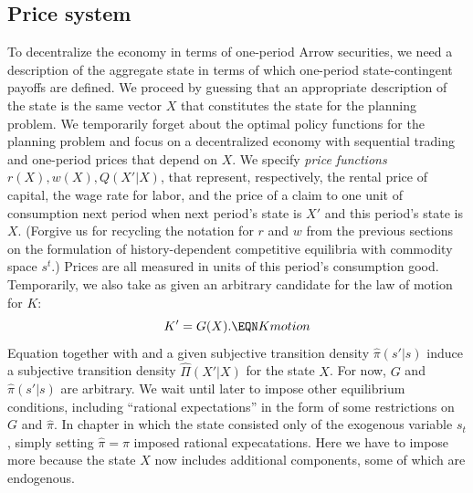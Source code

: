 \subsection{Price system}
To decentralize the economy in terms of one-period Arrow securities,
we need a description of the aggregate state in terms of which one-period
state-contingent payoffs are defined.  We proceed by guessing that an
appropriate description of the state is the same vector $X$ that
constitutes the state for the planning problem.  We temporarily forget
about the optimal policy functions for the planning problem and focus
on a decentralized economy with sequential trading and one-period
prices that depend on $X$. We specify {\it price functions\/}
$r(X), w(X), Q(X'|X)$, that represent, respectively, the rental price
of capital, the wage rate for labor, and the price of a claim to one
unit of consumption next period when next period's state is $X'$ and
this period's state is $X$.
(Forgive us for recycling the notation
for $r$ and $w$ from the previous sections on the formulation of
history-dependent competitive equilibria with commodity space
$s^t$.)
Prices are
all measured in units of this period's consumption good.
Temporarily, we also take as given an arbitrary candidate for the law of
motion for $K$:
$$ K' = G(X). \EQN Kmotion $$
Equation   together with  and a given
subjective transition
density $\hat \pi(s'|s)$ induce a subjective transition
density $\hat \Pi(X' |X)$ for the state $X$.
For now, $G$ and $\hat \pi(s'|s)$ are arbitrary. We wait until
later to impose other equilibrium conditions, including ``rational
expectations'' in the form of some restrictions on $G$ and $\hat \pi$.
In chapter  in which the state  consisted only of the exogenous variable $s_t$, simply setting $\hat \pi = \pi$ imposed rational 
expecatations.  Here we have to impose more because the state $X$  now  includes additional components, some of which 
are endogenous.  


%


